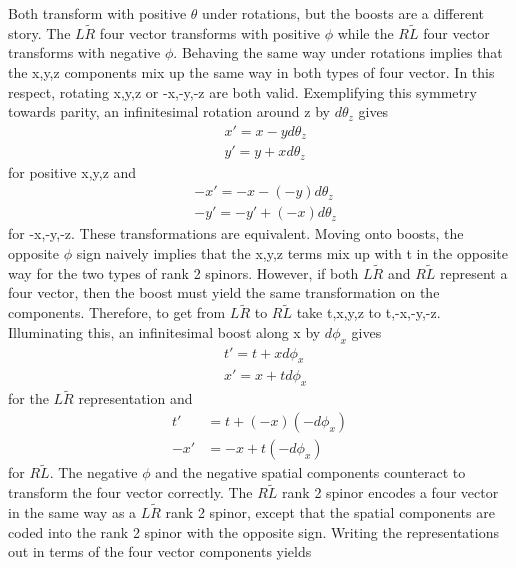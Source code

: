 \documentclass[12pt]{article}
\begin{document}
Both transform with positive $\theta$ under rotations, but the boosts are a different story. The $L\tilde{R}$ four vector transforms with positive $\phi$ while the $R\tilde{L}$ four vector transforms with negative $\phi$. Behaving the same way under rotations implies that the x,y,z components mix up the same way in both types of four vector. In this respect, rotating x,y,z or -x,-y,-z are both valid. Exemplifying this symmetry towards parity, an infinitesimal rotation around z by $d\theta_z$ gives 
\begin{equation}
\begin{split}
&x' = x - yd\theta_z \\
&y' = y + xd\theta_z
\end{split}
\end{equation}
for positive x,y,z and 
\begin{equation}
\begin{split}
&-x' = -x - (-y)d\theta_z \\
&-y' = -y' + (-x)d\theta_z
\end{split}
\end{equation}
for -x,-y,-z. These transformations are equivalent. Moving onto boosts, the opposite $\phi$ sign naively implies that the x,y,z terms mix up with t in the opposite way for the two types of rank 2 spinors. However, if both $L\tilde{R}$ and $R\tilde{L}$ represent a four vector, then the boost must yield the same transformation on the components. Therefore, to get from $L\tilde{R}$ to $R\tilde{L}$ take t,x,y,z to t,-x,-y,-z. Illuminating this, an infinitesimal boost along x by $d\phi_x$ gives 
\begin{equation}
\begin{split}
&t' = t + xd\phi_x \\
&x' = x + td\phi_x 
\end{split}
\end{equation}
for the $L\tilde{R}$ representation and 
\begin{equation}
\begin{split}
t' &= t + (-x)(-d\phi_x) \\ 
-x' &= -x + t(-d\phi_x)  
\end{split}
\end{equation}
for $R\tilde{L}$. The negative $\phi$ and the negative spatial components counteract to transform the four vector correctly. The $R\tilde{L}$ rank 2 spinor encodes a four vector in the same way as a $L\tilde{R}$ rank 2 spinor, except that the spatial components are coded into the rank 2 spinor with the opposite sign. Writing the representations out in terms of the four vector components yields
\end{document}
